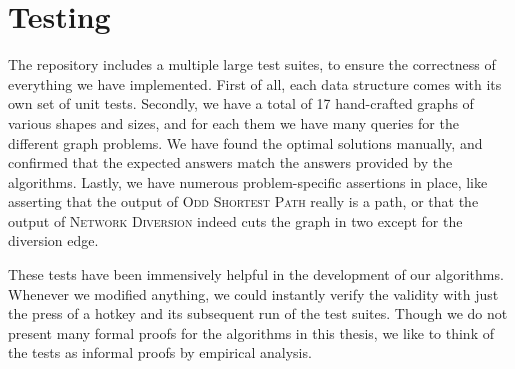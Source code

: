 \section{Testing}
The repository includes a multiple large test suites, to ensure the correctness of everything we have implemented. First of all, each data structure comes with its own set of unit tests. Secondly, we have a total of 17 hand-crafted graphs of various shapes and sizes, and for each them we have many queries for the different graph problems. We have found the optimal solutions manually, and confirmed that the expected answers match the answers provided by the algorithms. Lastly, we have numerous problem-specific assertions in place, like asserting that the output of \textsc{Odd Shortest Path} really is a path, or that the output of \textsc{Network Diversion} indeed cuts the graph in two except for the diversion edge.

These tests have been immensively helpful in the development of our algorithms. Whenever we modified anything, we could instantly verify the validity with just the press of a hotkey and its subsequent run of the test suites. Though we do not present many formal proofs for the algorithms in this thesis, we like to think of the tests as informal proofs by empirical analysis.